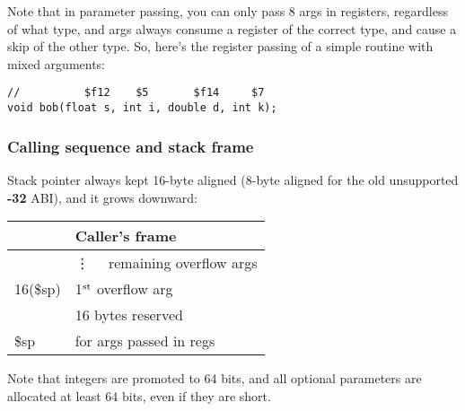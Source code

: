 \documentclass[11pt]{article}
\begin{document}
Note that in parameter passing, you can only pass 8 args in registers, 
regardless of what type, and args always consume a register of the correct
type, and cause a skip of the other type.  So, here's the register passing
of a simple routine with mixed arguments:
\begin{verbatim}
//          $f12    $5       $f14     $7
void bob(float s, int i, double d, int k);
\end{verbatim}

\subsubsection{Calling sequence and stack frame}
Stack pointer always kept 16-byte aligned (8-byte aligned for the old
unsupported {\bf -32} ABI), and it grows downward:
\begin{center}
\begin{tabular}{l|l|}
        & Caller's frame \\\hline
        & \vdots~~ remaining overflow args \\\hline
16(\$sp)& 1$^{\rm st}$ overflow arg \\\hline
        & 16 bytes reserved \\
\$sp    & for args passed in regs \\\hline
\end{tabular}
\end{center}

Note that integers are promoted to 64 bits, and all optional parameters
are allocated at least 64 bits, even if they are short.
\end{document}
